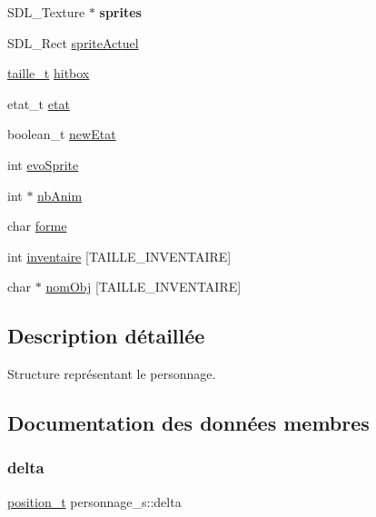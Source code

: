 \begin{DoxyCompactItemize}
\item 
\mbox{\label{structpersonnage__s_a97da32596524755cba3ba76782ab0205}} 
S\+D\+L\+\_\+\+Texture $\ast$ {\bfseries sprites}
\item 
S\+D\+L\+\_\+\+Rect \hyperlink{structpersonnage__s_afa75822afebdaf61725b7f87c86d5922}{sprite\+Actuel}
\item 
\hyperlink{structtaille__s}{taille\+\_\+t} \hyperlink{structpersonnage__s_a4a6fd4db944c59eaf1c4006f7e0b533c}{hitbox}
\item 
etat\+\_\+t \hyperlink{structpersonnage__s_a2d91f0a1a2e44164875be806c7a456cc}{etat}
\item 
boolean\+\_\+t \hyperlink{structpersonnage__s_ad9c2e07633c2a40855b169b4b677009f}{new\+Etat}
\item 
int \hyperlink{structpersonnage__s_a47750ce89c5dcdb6844e0a98afd5fd75}{evo\+Sprite}
\item 
int $\ast$ \hyperlink{structpersonnage__s_a05aa3037a7469f58464094d2bd2d683a}{nb\+Anim}
\item 
char \hyperlink{structpersonnage__s_a1f1eb200420640259201a84300bccf7e}{forme}
\item 
int \hyperlink{structpersonnage__s_a0aefe070eb6c9c73fe6a40c909d2dc30}{inventaire} \mbox{[}T\+A\+I\+L\+L\+E\+\_\+\+I\+N\+V\+E\+N\+T\+A\+I\+RE\mbox{]}
\item 
char $\ast$ \hyperlink{structpersonnage__s_a6fc3c82b6c4f407289aa55155876c867}{nom\+Obj} \mbox{[}T\+A\+I\+L\+L\+E\+\_\+\+I\+N\+V\+E\+N\+T\+A\+I\+RE\mbox{]}
\end{DoxyCompactItemize}


\subsection{Description détaillée}
Structure représentant le personnage. 

\subsection{Documentation des données membres}
\mbox{\label{structpersonnage__s_a09fb83af37953227050f9ced0410f032}} 
\subsubsection{\texorpdfstring{delta}{delta}}
{\footnotesize\ttfamily \hyperlink{structposition__s}{position\+\_\+t} personnage\+\_\+s\+::delta}

